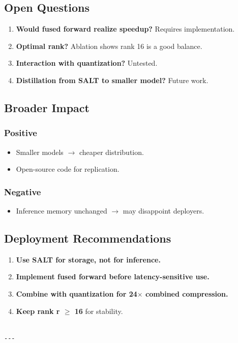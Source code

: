 \subsection{Open Questions}

\begin{enumerate}
\item \textbf{Would fused forward realize speedup?} Requires implementation.
\item \textbf{Optimal rank?} Ablation shows rank 16 is a good balance.
\item \textbf{Interaction with quantization?} Untested.
\item \textbf{Distillation from SALT to smaller model?} Future work.

\end{enumerate}
\subsection{Broader Impact}

\subsubsection{Positive}

\begin{itemize}
\item Smaller models $\to$ cheaper distribution.
\item Open-source code for replication.

\end{itemize}
\subsubsection{Negative}

\begin{itemize}
\item Inference memory unchanged $\to$ may disappoint deployers.

\end{itemize}
\subsection{Deployment Recommendations}

\begin{enumerate}
\item \textbf{Use SALT for storage, not for inference.}
\item \textbf{Implement fused forward before latency-sensitive use.}
\item \textbf{Combine with quantization for 24$\times$ combined compression.}
\item \textbf{Keep rank r $\ge$ 16} for stability.
\end{enumerate}
\begin{lstlisting}

---
\end{lstlisting}